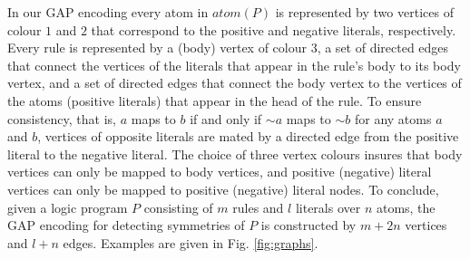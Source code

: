 \documentclass[envcountsame]{llncs}
\newcommand{\atom}[1]{atom(#1)}
\newcommand{\dneg}[0]{\sim\!\!}
\begin{document}
In our GAP encoding every atom in $\atom{P}$ is represented by two vertices of colour $1$ and $2$ that correspond to the positive and negative literals, respectively. Every rule is represented by a (body) vertex of colour $3$, a set of directed edges that connect the vertices of the literals that appear in the rule's body to its body vertex, and a set of directed edges that connect the body vertex to the vertices of the atoms (positive literals) that appear in the head of the rule. To ensure consistency, that is, $a$ maps to $b$ if and only if $\dneg a$ maps to $\dneg b$ for any atoms $a$ and $b$, vertices of opposite literals are mated by a directed edge from the positive literal to the negative literal. The choice of three vertex colours insures that body vertices can only be mapped to body vertices, and positive (negative) literal vertices can only be mapped to positive (negative) literal nodes. To conclude, given a logic program $P$ consisting of $m$ rules and $l$ literals over $n$ atoms, the GAP encoding for detecting symmetries of $P$ is constructed by $m+2n$ vertices and $l+n$ edges. Examples are given in Fig. \ref{fig:graphs}.
\end{document}
